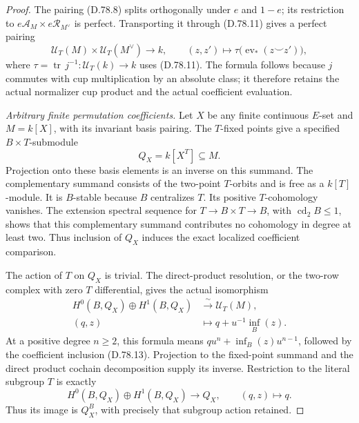 \begin{proof}
The pairing (D.78.8) splits orthogonally under $e$ and $1-e$; its restriction
to $e\mathcal A_M\times e\mathcal R_{M^\vee}$ is perfect. Transporting it
through (D.78.11) gives a perfect pairing
\[
 \mathcal U_T(M)\times\mathcal U_T(M^\vee)\longrightarrow k,
 \qquad(z,z')\longmapsto\tau\bigl(\operatorname{ev}_*(z\smile z')\bigr),
                                                               \tag{D.78.12}
\]
where $\tau=\operatorname{tr}\,j^{-1}:\mathcal U_T(k)\to k$ uses
(D.78.11). The formula follows because $j$ commutes with cup multiplication
by an absolute class; it therefore retains the actual normalizer cup
product and the actual coefficient evaluation.

\emph{Arbitrary finite permutation coefficients.}
Let $X$ be any finite continuous $E$-set and $M=k[X]$, with its invariant
basis pairing. The $T$-fixed points give a specified $B\times T$-submodule
\[
                         Q_X=k[X^T]\subseteq M.              \tag{D.78.13}
\]
Projection onto these basis elements is an inverse on this summand.
The complementary summand consists of the two-point $T$-orbits and is
free as a $k[T]$-module. It is $B$-stable because $B$ centralizes $T$.
Its positive $T$-cohomology vanishes. The extension spectral sequence
for $T\to B\times T\to B$, with $\operatorname{cd}_2B\leq1$, shows
that this complementary summand contributes no cohomology in degree
at least two. Thus inclusion of $Q_X$ induces the exact localized
coefficient comparison.

The action of $T$ on $Q_X$ is trivial. The direct-product resolution,
or the two-row complex with zero $T$ differential, gives the actual
isomorphism
\[
 \begin{aligned}
 H^0(B,Q_X)\oplus H^1(B,Q_X)&\xrightarrow{\ \sim\ }\mathcal U_T(M),\\
 (q,z)&\longmapsto q+u^{-1}\operatorname{inf}_B(z).
 \end{aligned}                                                \tag{D.78.14}
\]
At a positive degree $n\geq2$, this formula means
$q u^n+\operatorname{inf}_B(z)u^{n-1}$, followed by the coefficient
inclusion (D.78.13). Projection to the fixed-point summand and the direct
product cochain decomposition supply its inverse.
Restriction to the literal subgroup $T$ is exactly
\[
 H^0(B,Q_X)\oplus H^1(B,Q_X)\longrightarrow Q_X,
                         \qquad(q,z)\longmapsto q.           \tag{D.78.15}
\]
Thus its image is $Q_X^B$, with precisely that subgroup action retained.


\end{proof}
